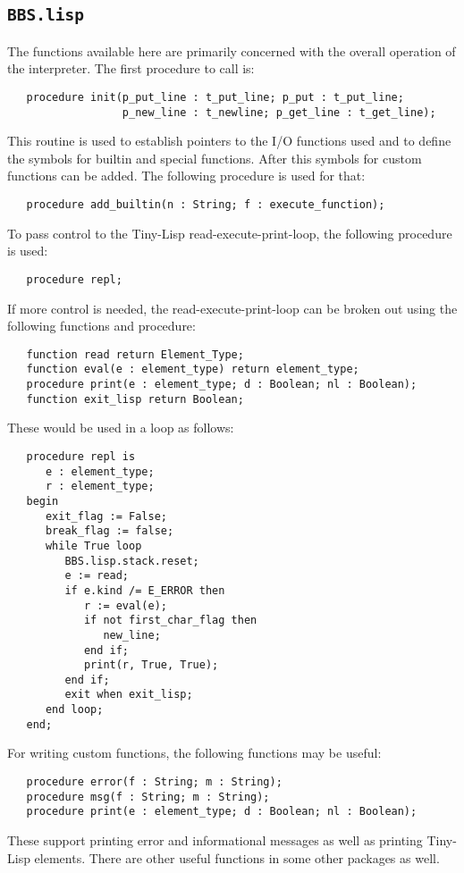 \documentclass[10pt, openany]{book}
\newcommand{\package}[1]{\texttt{#1}}
\newcommand{\tl}{Tiny-Lisp}
\begin{document}
\subsection{\package{BBS.lisp}}
The functions available here are primarily concerned with the overall operation of the interpreter.  The first procedure to call is:
\begin{lstlisting}
   procedure init(p_put_line : t_put_line; p_put : t_put_line;
                  p_new_line : t_newline; p_get_line : t_get_line);
\end{lstlisting}
This routine is used to establish pointers to the I/O functions used and to define the symbols for builtin and special functions.  After this symbols for custom functions can be added.  The following procedure is used for that:
\begin{lstlisting}
   procedure add_builtin(n : String; f : execute_function);
\end{lstlisting}
To pass control to the \tl{} read-execute-print-loop, the following procedure is used:
\begin{lstlisting}
   procedure repl;
\end{lstlisting}
If more control is needed, the read-execute-print-loop can be broken out using the following functions and procedure:
\begin{lstlisting}
   function read return Element_Type;
   function eval(e : element_type) return element_type;
   procedure print(e : element_type; d : Boolean; nl : Boolean);
   function exit_lisp return Boolean;
\end{lstlisting}
These would be used in a loop as follows:
\begin{lstlisting}
   procedure repl is
      e : element_type;
      r : element_type;
   begin
      exit_flag := False;
      break_flag := false;
      while True loop
         BBS.lisp.stack.reset;
         e := read;
         if e.kind /= E_ERROR then
            r := eval(e);
            if not first_char_flag then
               new_line;
            end if;
            print(r, True, True);
         end if;
         exit when exit_lisp;
      end loop;
   end;
\end{lstlisting}
For writing custom functions, the following functions may be useful:
\begin{lstlisting}
   procedure error(f : String; m : String);
   procedure msg(f : String; m : String);
   procedure print(e : element_type; d : Boolean; nl : Boolean);
\end{lstlisting}
These support printing error and informational messages as well as printing \tl{} elements.  There are other useful functions in some other packages as well.
\end{document}
